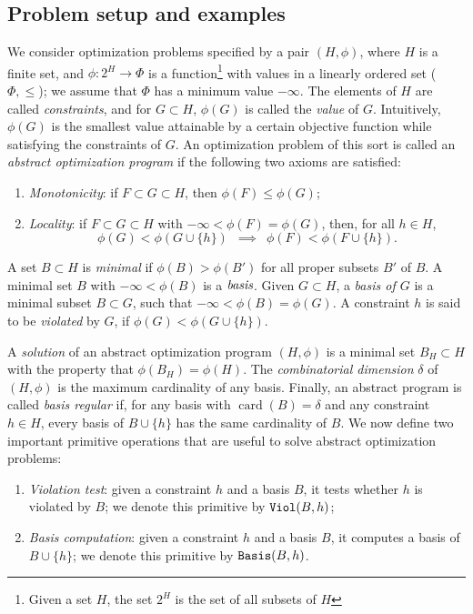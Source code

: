 \documentclass[onecolumn,journal,letterpaper]{IEEEtran}
\newcommand{\union}{\cup}
\newcommand{\map}[3]{#1: #2 \rightarrow #3}
\newcommand{\card}{\ensuremath{\operatorname{card}}}
\newcommand{\ViolTest}[2]{\textup{\texttt{Viol}}(#1, #2)}
\newcommand{\Basis}[2]{\textup{\texttt{Basis}}(#1, #2)}
\begin{document}
\subsection{Problem setup and examples }
We consider optimization problems specified by a pair $(H, \phi)$, where
$H$ is a finite set, and $\map{\phi}{2^H}{\Phi}$ is a
function\footnote{Given a set $H$, the set $2^H$ is the set of all subsets
  of $H$} with values in a linearly ordered set ($\Phi, \leq$); we assume
that $\Phi$ has a minimum value $-\infty$. The elements of $H$ are called
\emph{constraints}, and for $G\subset H$, $\phi(G)$ is called the
\emph{value} of $G$. Intuitively, $\phi(G)$ is the smallest value
attainable by a certain objective function while satisfying the constraints
of $G$. An optimization problem of this sort is called an \emph{abstract
  optimization program} if the following two axioms are satisfied:
\begin{enumerate}
\item \emph{Monotonicity}: if $F\subset G \subset H$, then $\phi(F) \leq
  \phi(G)$;
\item \emph{Locality}: if $F \subset G \subset H$ with $-\infty < \phi(F) =
  \phi(G)$, then, for all $h\in H$,
  \begin{equation*}
    \phi(G) < \phi(G \union \{h\})
    \enspace\implies\enspace \phi(F) < \phi(F \union \{h\}).
\end{equation*}
\end{enumerate}
A set $B\subset H$ is \emph{minimal} if $\phi(B)>\phi(B')$ for all
proper subsets $B'$ of $B$.  A minimal set $B$ with $-\infty<\phi(B)$ is
a $\emph{basis}$.  Given $G \subset H$, a \emph{basis of $G$} is a minimal
subset $B \subset G$, such that $-\infty<\phi(B) = \phi(G)$.  A
constraint $h$ is said to be \emph{violated} by $G$, if $\phi(G) <
\phi(G \union \{h\})$.

A \emph{solution} of an abstract optimization program $(H,\phi)$ is a
minimal set $B_H\subset H$ with the property that $\phi(B_H) = \phi(H)$.
The \emph{combinatorial dimension} $\delta$ of $(H, \phi)$ is the maximum
cardinality of any basis. Finally, an abstract program is called
\emph{basis regular} if, for any basis with $\card(B)=\delta$ and any
constraint $h\in H$, every basis of $B \union \{h\}$ has the same
cardinality of $B$. We now define two important primitive operations that
are useful to solve abstract optimization problems:
\begin{enumerate}
\item \emph{Violation test}: given a constraint $h$ and a basis $B$, it
  tests whether $h$ is violated by $B$; we denote this primitive by
  $\ViolTest{B}{h}$;
\item \emph{Basis computation}: given a constraint $h$ and a basis $B$, it
  computes a basis of $B\union \{h\}$;  we denote this primitive by
  $\Basis{B}{h}$.
\end{enumerate}
\end{document}
